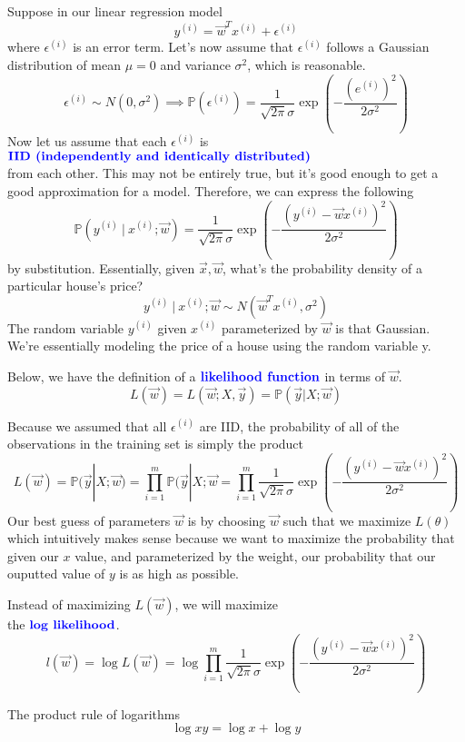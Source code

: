 \documentclass[12pt]{scrartcl}
\begin{document}
Suppose in our linear regression model
\[y^{(i)} = \vec{w}^Tx^{(i)} + \epsilon^{(i)}\]
where $\epsilon^{(i)}$ is an error term. Let's now assume that $\epsilon^{(i)}$
follows a Gaussian distribution of mean $\mu = 0$ and variance $\sigma^2$,
which is reasonable.
\[\epsilon^{(i)} \sim N(0,\sigma^2) \implies \mathbb{P}(\epsilon^{(i)}) = \frac{1}{\sqrt{2\pi}\sigma}\exp(-\frac{(e^{(i)})^2}{2\sigma^2})\]
Now let us assume that each $\epsilon^{(i)}$ is $\textbf{\color{blue} IID (independently and
        identically distributed)}$ \\from each other. This may not be entirely true,
but it's good enough to get a good approximation for a model. Therefore, we can
express the following
\[\mathbb{P}(y^{(i)} \ | \ x^{(i)}; \vec{w}) = \frac{1}{\sqrt{2\pi}\sigma }\exp(-\frac{(y^{(i)} - \vec{w}x^{(i)})^2}{2\sigma^2})\]
by substitution. Essentially, given $\vec{x}, \vec{w}$, what's the probability
density of a particular house's price?
\[y^{(i)} \ | \ x^{(i)}; \vec{w} \sim N(\vec{w}^Tx^{(i)}, \sigma^2)\]
The random variable $y^{(i)}$ given $x^{(i)}$ parameterized by $\vec{w}$ is
that Gaussian. We’re essentially modeling the price of a house using the random
variable y.
\begin{definition}
    Below, we have the definition of a $\textbf{\color{blue} likelihood function}$ in terms of $\vec{w}$.
    \[L(\vec{w}) = L(\vec{w}; X, \vec{y}) = \mathbb{P}(\vec{y} | X; \vec{w})\]
\end{definition}
Because we assumed that all $\epsilon^{(i)}$ are IID, the probability of all of the observations in the training set is simply the product
\[L(\vec{w}) = \mathbb{P}(\vec{y} | X; \vec{w}) = \prod_{i=1}^m \mathbb{P}(\vec{y} | X; \vec{w} = \prod_{i=1}^m \frac{1}{\sqrt{2\pi}\sigma }\exp(-\frac{(y^{(i)} - \vec{w}x^{(i)})^2}{2\sigma^2})\]
Our best guess of parameters $\vec{w}$ is by choosing $\vec{w}$ such that we
maximize $L(\theta)$ which intuitively makes sense because we want to maximize
the probability that given our $x$ value, and parameterized by the weight, our
probability that our ouputted value of $y$ is as high as possible.
\begin{definition}
    Instead of maximizing $L(\vec{w})$, we will maximize \\the $\textbf{\color{blue} log likelihood}$.
    \[l(\vec{w}) = \log L(\vec{w}) = \log \prod_{i=1}^m \frac{1}{\sqrt{2\pi}\sigma }\exp(-\frac{(y^{(i)} - \vec{w}x^{(i)})^2}{2\sigma^2})\]
\end{definition}
\begin{note}
    The product rule of logarithms
    \[\log xy = \log x + \log y\]
\end{note}
\end{document}
